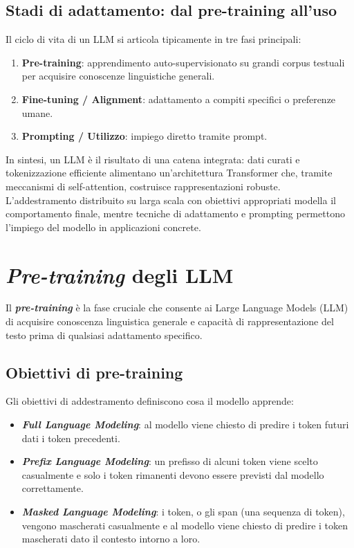 \subsection{Stadi di adattamento: dal pre-training all'uso}
Il ciclo di vita di un LLM si articola tipicamente in tre fasi principali:
\begin{enumerate}
    \item \textbf{Pre-training}: apprendimento auto-supervisionato su grandi corpus testuali per acquisire conoscenze linguistiche generali.
    \item \textbf{Fine-tuning / Alignment}: adattamento a compiti specifici o preferenze umane.
    \item \textbf{Prompting / Utilizzo}: impiego diretto tramite prompt.
\end{enumerate}

In sintesi, un LLM è il risultato di una catena integrata: dati curati e tokenizzazione efficiente alimentano un'architettura Transformer che, 
tramite meccanismi di self-attention, costruisce rappresentazioni robuste. L'addestramento distribuito su larga scala con obiettivi appropriati 
modella il comportamento finale, mentre tecniche di adattamento e prompting permettono l'impiego del modello in applicazioni concrete.

\newpage
\section{\textit{Pre-training} degli LLM}

Il \textbf{\textit{pre-training}} è la fase cruciale che consente ai Large Language Models (LLM) di acquisire conoscenza linguistica generale e capacità di 
rappresentazione del testo prima di qualsiasi adattamento specifico.

\subsection{Obiettivi di pre-training}
Gli obiettivi di addestramento definiscono cosa il modello apprende:
\begin{itemize}
    \item \textbf{\textit{Full Language Modeling}}: al modello viene chiesto di predire i token futuri dati i token precedenti.
    \item \textbf{\textit{Prefix Language Modeling}}: un prefisso di alcuni token viene scelto casualmente e solo i token rimanenti
    devono essere previsti dal modello correttamente.
    \item \textbf{\textit{Masked Language Modeling}}: i token, o gli span (una sequenza di token), vengono mascherati casualmente e al modello 
    viene chiesto di predire i token mascherati dato il contesto intorno a loro.
    \cite{wang2022what}
\end{itemize}


